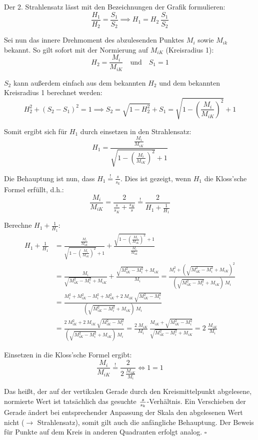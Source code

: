\documentclass[11pt]{article}
\begin{document}
Der 2. Strahlensatz lässt mit den Bezeichnungen der Grafik formulieren:
\[
	\frac{H_1}{H_2} = \frac{S_1}{S_2} \implies H_1 = H_2 ~ \frac{S_1}{S_2}
\]

Sei nun das innere Drehmoment des abzulesenden Punktes $M_i$ sowie $M_{ik}$ bekannt. So gilt sofort mit der Normierung auf $M_{iK}$ (Kreisradius 1):
\[
	H_2 = \frac{M_i}{M_{iK}} \quad \mathrm{und} \quad S_1 = 1
\]

$S_2$ kann außerdem einfach aus dem bekannten $H_2$ und dem bekannten Kreisradius 1 berechnet werden:
\[
	H_2^2 + (S_2 - S_1)^2 = 1 \implies S_2 = \sqrt{1 - H_2^2} + S_1 = \sqrt{1 - \left( \frac{M_i}{M_{iK}} \right)^2} + 1
\]

Somit ergibt sich für $H_1$ durch einsetzen in den Strahlensatz:
\[
	H_1 = \frac{\frac{M_i}{M_{iK}}}{\sqrt{1 - \left( \frac{M_i}{M_{iK}} \right)^2} + 1}
\]

Die Behauptung ist nun, dass $H_1 \overset{!}{=} \frac{s}{s_k}$. Dies ist gezeigt, wenn $H_1$ die Kloss'sche Formel erfüllt, d.h.:
\[
	\frac{M_i}{M_{iK}} = \frac{2}{\frac{s}{s_K} + \frac{s_K}{s}} \overset{!}{=} \frac{2}{H_1 + \frac{1}{H_1}}
\]

Berechne $H_1 + \frac{1}{H_1}$:
\begin{align*}
H_1 + \frac{1}{H_1}
		&= \frac{\frac{M_i}{M_{iK}}}{\sqrt{1 - \left( \frac{M_i}{M_{iK}} \right)^2} + 1} + \frac{\sqrt{1 - \left( \frac{M_i}{M_{iK}} \right)^2} + 1}{\frac{M_i}{M_{iK}}} \\
		&= \frac{M_i}{\sqrt{M_{iK}^2 - M_i^2} + M_{iK}} + \frac{\sqrt{M_{iK}^2 - M_i^2} + M_{iK}}{M_i} = \frac{M_i^2 + \left(\sqrt{M_{iK}^2 - M_i^2} + M_{iK}\right)^2}{\left(\sqrt{M_{iK}^2 - M_i^2} + M_{iK}\right)~M_i} \\
		&= \frac{M_i^2 + M_{iK}^2 - M_i^2 + M_{iK}^2 + 2 ~ M_{iK} ~ \sqrt{M_{iK}^2 - M_i^2}}{\left(\sqrt{M_{iK}^2 - M_i^2} + M_{iK}\right)~M_i} \\
		&= \frac{2 ~ M_{iK}^2 + 2 ~ M_{iK} ~ \sqrt{M_{iK}^2 - M_i^2}}{\left(\sqrt{M_{iK}^2 - M_i^2} + M_{iK}\right)~M_i} = \frac{2 \; M_{iK}}{M_i} ~ \frac{M_{iK} + \sqrt{M_{iK}^2 - M_i^2}}{\sqrt{M_{iK}^2 - M_i^2} + M_{iK}} = 2 ~ \frac{M_{iK}}{M_i}
\end{align*}

Einsetzen in die Kloss'sche Formel ergibt:
\[
	\frac{M_i}{M_{iK}} \overset{!}{=} \frac{2}{2 ~ \frac{M_{iK}}{M_i}} \Leftrightarrow 1 = 1
\]

Das heißt, der auf der vertikalen Gerade durch den Kreismittelpunkt abgelesene, normierte Wert ist tatsächlich das gesuchte $s \over s_k$-Verhältnis. Ein Verschieben der Gerade ändert bei entsprechender Anpassung der Skala den abgelesenen Wert nicht ($\rightarrow$ Strahlensatz), somit gilt auch die anfängliche Behauptung. Der Beweis für Punkte auf dem Kreis in anderen Quadranten erfolgt analog. $\square$
\end{document}
